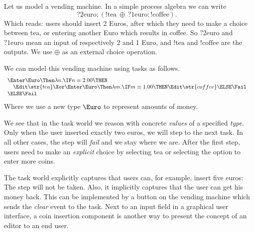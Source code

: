 Let us model a vending machine.
In a simple process algebra we can write
\begin{equation*}
  ?\text{2euro}; (!\text{tea}\ \oplus\ ?\text{1euro}; !\text{coffee}).
\end{equation*}
Which reads:
users should insert 2 Euros,
after which they need to make a choice between tea,
or entering another Euro which results in coffee.
So $?\text{2euro}$ and $?\text{1euro}$ mean an input of respectively 2 and 1 Euro,
and $!\text{tea}$ and $!\text{coffee}$ are the outputs.
We use $\oplus$ as an external choice operation.

We can model this vending machine using tasks as follows.
\begin{equation*}
  \begin{array}{l}
    \Enter \Euro \Then \lambda n.
    \IF n \equiv 2.00 \THEN \\
     \quad \Edit \str{tea}
      \Xor
        \Enter \Euro \Then \lambda m.
        \IF m \equiv 1.00 \THEN
          \Edit \str{coffee}
        \ELSE
          \Fail \\
    \ELSE \Fail
  \end{array}
\end{equation*}
Where we use a new type $\Euro$ to represent amounts of money.

We see that in the task world we reason with concrete \emph{values} of a specified \emph{type}.
Only when the user inserted exactly two euros,
we will step to the next task.
In all other cases,
the step will \emph{fail} and we stay where we are.
After the first step,
users need to make an \emph{explicit} choice by selecting tea or selecting the option to enter more coins.

The task world explicitly captures that users can, for example, insert five euros:
The step will not be taken.
Also, it implicitly captures that the user can get his money back.
This can be implemented by a button on the vending machine which sends the \emph{clear} event to the task.
Next to an input field in a graphical user interface,
a coin insertion component is another way to present the concept of an editor to an end user.


